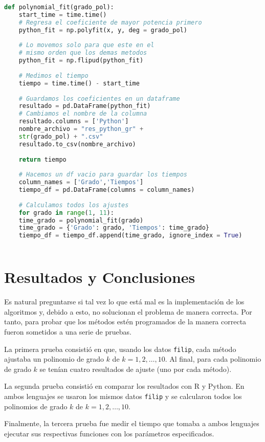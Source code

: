 \begin{lstlisting}[language=Python]
	def polynomial_fit(grado_pol):
	start_time = time.time()
	# Regresa el coeficiente de mayor potencia primero
	python_fit = np.polyfit(x, y, deg = grado_pol)
	
	# Lo movemos solo para que este en el 
	# mismo orden que los demas metodos
	python_fit = np.flipud(python_fit)
	
	# Medimos el tiempo
	tiempo = time.time() - start_time
	
	# Guardamos los coeficientes en un dataframe
	resultado = pd.DataFrame(python_fit)
	# Cambiamos el nombre de la columna
	resultado.columns = ['Python']
	nombre_archivo = "res_python_gr" + 
	str(grado_pol) + ".csv"
	resultado.to_csv(nombre_archivo)
	
	return tiempo
	
	# Hacemos un df vacio para guardar los tiempos
	column_names = ['Grado','Tiempos']
	tiempo_df = pd.DataFrame(columns = column_names)
	
	# Calculamos todos los ajustes
	for grado in range(1, 11):
	time_grado = polynomial_fit(grado)
	time_grado = {'Grado': grado, 'Tiempos': time_grado}
	tiempo_df = tiempo_df.append(time_grado, ignore_index = True)
	
\end{lstlisting}

\section{Resultados y Conclusiones} \label{sec_evalMetodos}
Es natural preguntarse si tal vez lo que está mal es la implementación de los algoritmos y, debido a esto, no solucionan el problema de manera correcta. Por tanto, para probar que los métodos estén programados de la manera correcta fueron sometidos a una serie de pruebas.

La primera prueba consistió en que, usando los datos \texttt{filip}, cada método ajustaba un polinomio de grado $k$ de $k = 1, 2, \dots, 10$. Al final, para cada polinomio de grado $k$ se tenían cuatro resultados de ajuste (uno por cada método). 

La segunda prueba consistió en comparar los resultados con \textsf{R} y \textsf{Python}. En ambos lenguajes se usaron los mismos datos \texttt{filip} y se calcularon todos los polinomios  de grado $k$ de $k = 1, 2, \dots, 10$.



Finalmente, la tercera prueba fue medir el tiempo que tomaba a ambos lenguajes ejecutar sus respectivas funciones con los parámetros especificados. 



